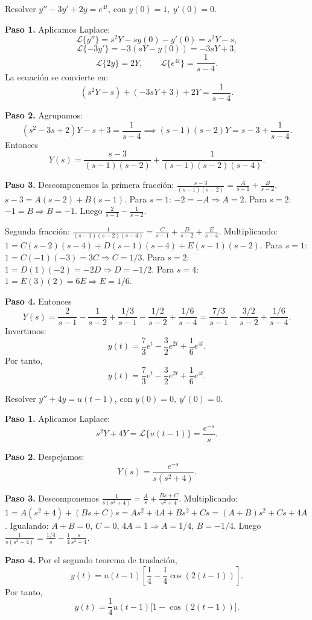 \begin{example}
Resolver $y'' - 3y' + 2y = e^{4t}$, con $y(0)=1,\ y'(0)=0$.
\begin{myproof}
\textbf{Paso 1.} Aplicamos Laplace:
\[
\mathcal{L}\{y''\} = s^2Y - s y(0) - y'(0) = s^2Y - s,
\]
\[
\mathcal{L}\{-3y'\} = -3(sY - y(0)) = -3sY + 3,
\]
\[
\mathcal{L}\{2y\} = 2Y,\qquad \mathcal{L}\{e^{4t}\} = \frac{1}{s-4}.
\]
La ecuación se convierte en:
\[
(s^2Y - s) + (-3sY + 3) + 2Y = \frac{1}{s-4}.
\]

\textbf{Paso 2.} Agrupamos:
\[
(s^2 - 3s + 2)Y - s + 3 = \frac{1}{s-4} \implies (s-1)(s-2)Y = s - 3 + \frac{1}{s-4}.
\]
Entonces
\[
Y(s) = \frac{s-3}{(s-1)(s-2)} + \frac{1}{(s-1)(s-2)(s-4)}.
\]

\textbf{Paso 3.} Descomponemos la primera fracción: $\frac{s-3}{(s-1)(s-2)} = \frac{A}{s-1} + \frac{B}{s-2}$. $s-3 = A(s-2)+B(s-1)$. Para $s=1$: $-2 = -A \Rightarrow A=2$. Para $s=2$: $-1 = B \Rightarrow B=-1$. Luego $\frac{2}{s-1} - \frac{1}{s-2}$.

Segunda fracción: $\frac{1}{(s-1)(s-2)(s-4)} = \frac{C}{s-1} + \frac{D}{s-2} + \frac{E}{s-4}$. Multiplicando:
$1 = C(s-2)(s-4) + D(s-1)(s-4) + E(s-1)(s-2)$.
Para $s=1$: $1 = C(-1)(-3)=3C \Rightarrow C=1/3$.
Para $s=2$: $1 = D(1)(-2) = -2D \Rightarrow D=-1/2$.
Para $s=4$: $1 = E(3)(2)=6E \Rightarrow E=1/6$.

\textbf{Paso 4.} Entonces
\[
Y(s) = \frac{2}{s-1} - \frac{1}{s-2} + \frac{1/3}{s-1} - \frac{1/2}{s-2} + \frac{1/6}{s-4}
= \frac{7/3}{s-1} - \frac{3/2}{s-2} + \frac{1/6}{s-4}.
\]
Invertimos:
\[
y(t) = \frac{7}{3}e^{t} - \frac{3}{2}e^{2t} + \frac{1}{6}e^{4t}.
\]
Por tanto,
\[
\boxed{y(t) = \frac{7}{3}e^{t} - \frac{3}{2}e^{2t} + \frac{1}{6}e^{4t}.}
\]
\end{myproof}
\end{example}

\begin{example}
Resolver $y'' + 4y = u(t-1)$, con $y(0)=0,\ y'(0)=0$.
\begin{myproof}
\textbf{Paso 1.} Aplicamos Laplace:
\[
s^2Y + 4Y = \mathcal{L}\{u(t-1)\} = \frac{e^{-s}}{s}.
\]

\textbf{Paso 2.} Despejamos:
\[
Y(s) = \frac{e^{-s}}{s(s^2+4)}.
\]

\textbf{Paso 3.} Descomponemos $\frac{1}{s(s^2+4)} = \frac{A}{s} + \frac{Bs+C}{s^2+4}$. Multiplicando:
$1 = A(s^2+4) + (Bs+C)s = A s^2 + 4A + B s^2 + C s = (A+B)s^2 + C s + 4A$.
Igualando: $A+B=0$, $C=0$, $4A=1 \Rightarrow A=1/4$, $B=-1/4$.
Luego $\frac{1}{s(s^2+4)} = \frac{1/4}{s} - \frac{1}{4}\frac{s}{s^2+4}$.

\textbf{Paso 4.} Por el segundo teorema de traslación,
\[
y(t) = u(t-1)\left[\frac{1}{4} - \frac{1}{4}\cos(2(t-1))\right].
\]
Por tanto,
\[
\boxed{y(t) = \frac{1}{4}u(t-1)\big[1 - \cos(2(t-1))\big].}
\]
\end{myproof}
\end{example}

